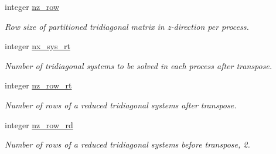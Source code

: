 \begin{DoxyCompactItemize}
integer \hyperlink{structpascal__tdma__cuda_1_1ptdma__plan__many__cuda_abb6b78165b33a6d0f4c6071bf0c82cb8}{nz\+\_\+row}
\begin{DoxyCompactList}\small\item\em Row size of partitioned tridiagonal matrix in z-\/direction per process. \end{DoxyCompactList}\item 
integer \hyperlink{structpascal__tdma__cuda_1_1ptdma__plan__many__cuda_a814c894fc8d118f7c7d815dafa6f2938}{nx\+\_\+sys\+\_\+rt}
\begin{DoxyCompactList}\small\item\em Number of tridiagonal systems to be solved in each process after transpose. \end{DoxyCompactList}\item 
integer \hyperlink{structpascal__tdma__cuda_1_1ptdma__plan__many__cuda_a7851f23de66e323f86e4b0383b2fdd3f}{nz\+\_\+row\+\_\+rt}
\begin{DoxyCompactList}\small\item\em Number of rows of a reduced tridiagonal systems after transpose. \end{DoxyCompactList}\item 
integer \hyperlink{structpascal__tdma__cuda_1_1ptdma__plan__many__cuda_abac7f0bc27e004dcf86abf85f1810c12}{nz\+\_\+row\+\_\+rd}
\begin{DoxyCompactList}\small\item\em Number of rows of a reduced tridiagonal systems before transpose, 2. \end{DoxyCompactList}\end{DoxyCompactItemize}
\textbf{ }\par
